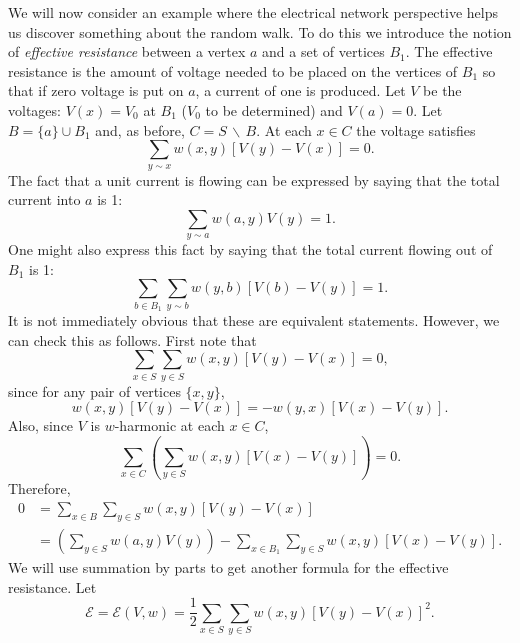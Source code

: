 \documentclass{stml-l}
\theoremstyle{definition}
\numberwithin{equation}{chapter}
\numberwithin{figure}{chapter}
\numberwithin{figure}{section}
\begin{document}
We will now consider an example where the electrical network
perspective helps us discover something about the random walk. To do
this we introduce the notion of \emph{effective resistance} between
a vertex $a$ and a set of vertices $B_{1}$. The effective resistance
is the amount of voltage needed to be placed on the vertices of
$B_{1}$ so that if zero voltage is put on $a$, a current of one is
produced. Let $V$ be the voltages: $V(x)=V_{0}$ at $B_{1}$ ($V_{0}$
to be determined) and $V(a)=0$. Let $B=\{a\}\cup B_{1}$ and, as
before, $C=S\,\backslash\,B$. At each $x\in C$ the voltage satisfies
\begin{equation*}
\sum\limits_{y\sim x}w(x,y)[V(y)-V(x)]=0.
\end{equation*}
The fact that a unit current is flowing can be expressed by saying
that the total current into $a$ is 1:
\begin{equation*}
\sum\limits_{y\sim a}w(a,y)V(y)=1.
\end{equation*}
One might also express this fact by saying that the total current
flowing out of $B_{1}$ is 1:
\begin{equation}
\label{ch09:eqn9.3}\sum\limits_{b\in B_{1}}\sum\limits_{y\sim
b}w(y,b)[V(b)-V(y)]=1.
\end{equation}
It is not immediately obvious that these are equivalent statements.
However, we can check this as follows. First note that
\begin{equation*}
\sum\limits_{x\in S}\sum\limits_{y\in S}w(x,y)[V(y)-V(x)]=0,
\end{equation*}
since for any pair of vertices $\{x,y\}$,
\begin{equation*}
w(x,y)[V(y)-V(x)]=-w(y,x)[V(x)-V(y)].
\end{equation*}
Also, since $V$ is $w$-harmonic at each $x\in C$,
\begin{equation*}
\sum\limits_{x\in C}\left(\sum\limits_{y\in
S}w(x,y)[V(x)-V(y)]\right)=0.
\end{equation*}
Therefore,
\begin{align*}
0 &= \sum\limits_{x\in B}\sum\limits_{y\in S}w(x,y)[V(y)-V(x)]\\
&=\left(\sum\limits_{y\in S}w(a,y)V(y)\right)-\sum\limits_{x\in
B_{1}}\sum\limits_{y\in S}w(x,y)[V(x)-V(y)].
\end{align*}
We will use summation by parts to get another formula for the
effective resistance. Let
\begin{equation*}
\mathcal{E}=\mathcal{E}(V,w)=\frac{1}{2}\sum\limits_{x\in
S}\sum\limits_{y\in S}w(x,y)[V(y)-V(x)]^{2}.
\end{equation*}
\end{document}
